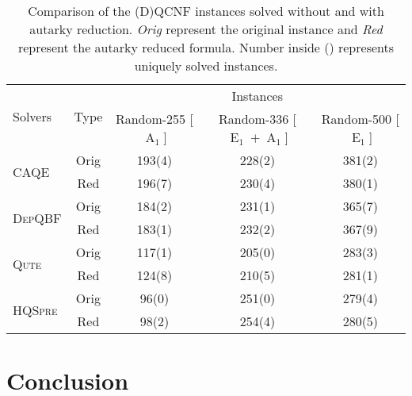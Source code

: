 \documentclass[runningheads]{llncs}
\DeclareMathOperator{\Aaut}{A}
\DeclareMathOperator{\Eaut}{E}
\newcommand{\caqe}{\textsc{CAQE}}
\newcommand{\depqbf}{\textsc{DepQBF}}
\newcommand{\qute}{\textsc{Qute}}
\newcommand{\hqspre}{\textsc{HQSpre}}
\begin{document}
\begin{table}
	\caption{Comparison of the (D)QCNF instances solved without and with autarky reduction. \emph{Orig} represent the original instance and \emph{Red} represent the autarky reduced formula. Number inside () represents uniquely solved instances.  }\label{tab:solver-eval}
	\begin{tabular}{l| c |c c c }
		
		\hline
		\multirow{2}{2.5cm}{Solvers} &  \multirow{2}{1cm}{Type} & \multicolumn{3}{c}{Instances} \\
		\cline{3-5}
		& & Random-255 [$\Aaut_1$] & Random-336 [$\Eaut_1+\Aaut_1$] & Random-500 [$\Eaut_1$] \\\hline
		
		
		\hline
		\multirow{2}{*}{\caqe} & Orig & 193(4) & 228(2) & 381(2) \\
		& Red & 196(7) & 230(4) & 380(1)\\\hline
		\multirow{2}{*}{\depqbf} & Orig & 184(2) & 231(1) & 365(7)\\
		& Red & 183(1)& 232(2)& 367(9)\\\hline
		\multirow{2}{*}{\qute} & Orig & 117(1) & 205(0) & 283(3)  \\
		& Red  & 124(8) & 210(5) & 281(1) \\\hline
		\multirow{2}{*}{\hqspre} & Orig & 96(0) &251(0) & 279(4) \\
		& Red  & 98(2)& 254(4) & 280(5) \\
		
		\hline
	\end{tabular}
\end{table}

\section{Conclusion}
\label{sec:conclusion}



\end{document}
